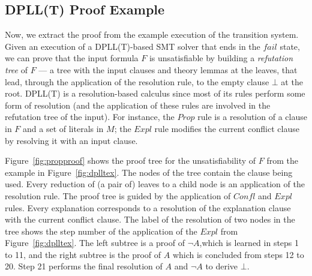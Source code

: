 \documentclass{article}
\begin{document}
	\subsection{DPLL(T) Proof Example}
	\label{sec:proofex}
	Now, we extract the proof from the 
	example execution of the transition system.
	Given an execution of a DPLL(T)-based 
	SMT solver that ends in the $fail$ state, 
	we can prove that the input formula 
	$F$ is unsatisfiable by building a 
	\textit{refutation tree} of $F$ --- a 
	tree with the input clauses 
	and theory lemmas at the leaves, 
	that lead, through the application of 
	the resolution rule, to the empty 
	clause $\bot$ at the root. DPLL(T) is 
	a resolution-based calculus since most 
	of its rules perform some form of 
	resolution (and the application of 
	these rules are involved in the 
	refutation tree of the input). For 
	instance, the $Prop$ rule is a 
	resolution of a clause in $F$ and a 
	set of literals in $M$; the $Expl$ 
	rule modifies the current conflict 
	clause by resolving it with an 
	input clause.
	
	Figure~\ref{fig:propproof} shows the 
	proof tree for the unsatisfiability of 
	$F$ from the example in 
	Figure~\ref{fig:dplltex}. The nodes of 
	the tree contain the clause being 
	used. Every reduction of 
	(a pair of) leaves to a child node 
	is an application of the resolution 
	rule. The proof tree is guided by 
	the application of $Confl$ and $Expl$ 
	rules. Every explanation corresponds 
	to a resolution of the explanation
	clause with the current 
	conflict clause. The label 
	of the resolution of two 
	nodes in the tree shows the 
	step number of the application 
	of the $Expl$ from 
	Figure~\ref{fig:dplltex}.
	The left subtree is a proof of 
	$\neg A$,which is learned in steps 
	1 to 11, and the right subtree is the 
	proof of $A$ which is concluded from 
	steps 12 to 20. Step 21 performs 
	the final resolution of $A$ and 
	$\neg A$ to derive $\bot$.
	
\end{document}
